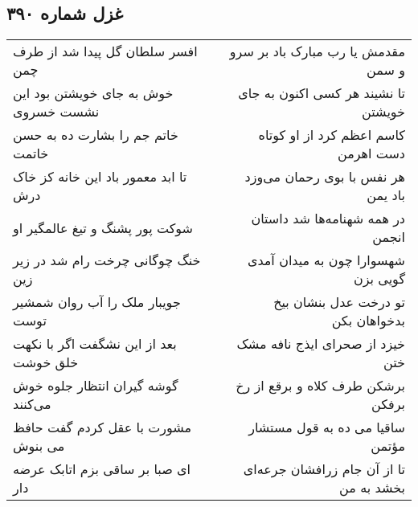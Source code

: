 \begin{center}
\section*{غزل شماره ۳۹۰}
\label{sec:sh390}
\begin{longtable}{l p{0.5cm} r}
افسر سلطان گل پیدا شد از طرف چمن
&&
مقدمش یا رب مبارک باد بر سرو و سمن
\\
خوش به جای خویشتن بود این نشست خسروی
&&
تا نشیند هر کسی اکنون به جای خویشتن
\\
خاتم جم را بشارت ده به حسن خاتمت
&&
کاسم اعظم کرد از او کوتاه دست اهرمن
\\
تا ابد معمور باد این خانه کز خاک درش
&&
هر نفس با بوی رحمان می‌وزد باد یمن
\\
شوکت پور پشنگ و تیغ عالمگیر او
&&
در همه شهنامه‌ها شد داستان انجمن
\\
خنگ چوگانی چرخت رام شد در زیر زین
&&
شهسوارا چون به میدان آمدی گویی بزن
\\
جویبار ملک را آب روان شمشیر توست
&&
تو درخت عدل بنشان بیخ بدخواهان بکن
\\
بعد از این نشگفت اگر با نکهت خلق خوشت
&&
خیزد از صحرای ایذج نافه مشک ختن
\\
گوشه گیران انتظار جلوه خوش می‌کنند
&&
برشکن طرف کلاه و برقع از رخ برفکن
\\
مشورت با عقل کردم گفت حافظ می بنوش
&&
ساقیا می ده به قول مستشار مؤتمن
\\
ای صبا بر ساقی بزم اتابک عرضه دار
&&
تا از آن جام زرافشان جرعه‌ای بخشد به من
\\
\end{longtable}
\end{center}
